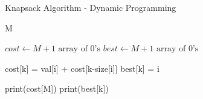\documentclass{article}
\begin{document}
\begin{algorithm}[h]
\caption{Knapsack Algorithm - Dynamic Programming}
\begin{algorithmic}[1]

 {M}

\State $cost \gets M + 1 \text{ array of 0's}$
\State $best \gets M + 1 \text{ array of 0's}$

			\State cost[k] = val[i] + cost[k-size[i]]
			\State best[k] = i
		\EndIf
	\EndFor
\EndFor

\State print(cost[M])
	\State print(best[k])
\EndFor

\EndProcedure

\end{algorithmic}
\end{algorithm}
\end{document}
